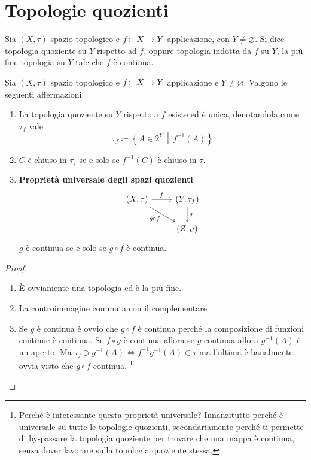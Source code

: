 \section{Topologie quozienti}

\begin{definition}
	Sia $(X, \tau)$ spazio topologico e $f \colon\ X \rightarrow Y$ applicazione, con $Y \neq \varnothing$. Si dice topologia quoziente su $Y$ rispetto ad $f$, oppure topologia indotta da $f$ su $Y$, la più fine topologia su $Y$ tale che $f$ è continua. 
\end{definition}

\begin{theorem}
	Sia $(X, \tau)$ spazio topologico e $f \colon\ X \rightarrow Y$ applicazione e $Y \neq \varnothing$. Valgono le seguenti affermazioni 
	\begin{enumerate}
		\item La topologia quoziente su $Y$ rispetto a $f$ esiste ed è unica, denotandola come $\tau_f$ vale 
		\begin{equation*}
			\tau_f \coloneqq \left\{ A \in 2^Y \,\middle|\, f^{-1}(A) \right\}
		\end{equation*}
		\item $C$ è chiuso in $\tau_f$ se e solo se $f^{-1}(C)$ è chiuso in $\tau$.
		\item \textbf{Proprietà universale degli  spazi quozienti} 
		\begin{equation*}
		\begin{tikzcd}
		(X, \tau) \arrow[swap]{rd}{g\circ f} \arrow{r}{f} & (Y, \tau_f) \arrow{d}{g} \\
		& (Z, \mu) 
		\end{tikzcd}
		\end{equation*}
		$g$ è continua se e solo se $g \circ f$ è continua. 
	\end{enumerate}
\end{theorem}
\begin{proof}
	\begin{enumerate}
		\item È ovviamente una topologia ed è la più fine. 
		\item La controimmagine commuta con il complementare. 
		\item Se $g$ è continua è ovvio che $g \circ f$ è continua perché la composizione di funzioni continue è continua. Se $f\circ g$ è continua allora se $g$ continua allora $g^{-1}(A)$ è un aperto. Ma $ \tau_f \ni g^{-1}(A) \Leftrightarrow f^{-1}g^{-1}(A) \in \tau$ ma l'ultima è banalmente ovvia visto che $g \circ f$ continua. \footnote{Perché è interessante questa proprietà universale? Innanzitutto perché è universale su tutte le topologie quozienti, secondariamente perché ti permette di by-passare la topologia quoziente per trovare che una mappa è continua, senza dover lavorare sulla topologia quoziente stessa.}
	\end{enumerate}
\end{proof}

